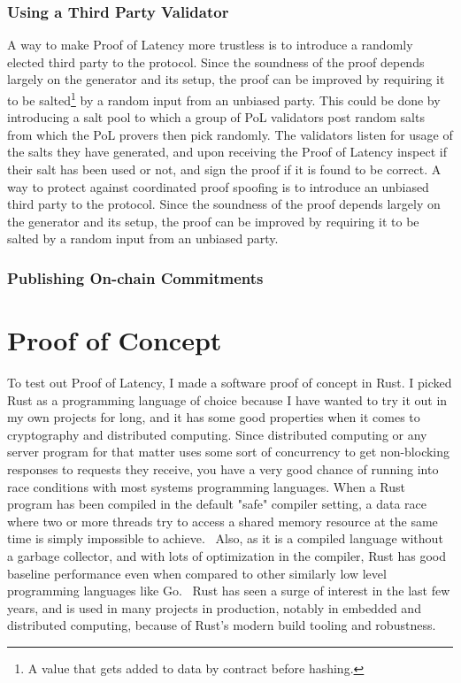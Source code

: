 \subsection{Using a Third Party Validator}
A way to make Proof of Latency more trustless is to introduce a randomly elected third party to the protocol. Since the soundness of the proof depends largely on the generator and its setup, the proof can be improved by requiring it to be salted\footnote{A value that gets added to data by contract before hashing.} by a random input from an unbiased party. This could be done by introducing a salt pool to which a group of PoL validators post random salts from which the PoL provers then pick randomly. The validators listen for usage of the salts they have generated, and upon receiving the Proof of Latency inspect if their salt has been used or not, and sign the proof if it is found to be correct. A way to protect against coordinated proof spoofing is to introduce an unbiased third party to the protocol. Since the soundness of the proof depends largely on the generator and its setup, the proof can be improved by requiring it to be salted by a random input from an unbiased party.


\subsection{Publishing On-chain Commitments}

\chapter{Proof of Concept}
\label{Proof of Concept}
To test out Proof of Latency, I made a software proof of concept in Rust. I picked Rust as a programming language of choice because I have wanted to try it out in my own projects for long, and it has some good properties when it comes to cryptography and distributed computing. Since distributed computing or any server program for that matter uses some sort of concurrency to get non-blocking responses to requests they receive, you have a very good chance of running into race conditions with most systems programming languages. When a Rust program has been compiled in the default "safe" compiler setting, a data race where two or more threads try to access a shared memory resource at the same time is simply impossible to achieve.~\cite{The_Rust_Project_Developers2018-xh} Also, as it is a compiled language without a garbage collector, and with lots of optimization in the compiler, Rust has good baseline performance even when compared to other similarly low level programming languages like Go.~\cite{Howarth2020-zc} Rust has seen a surge of interest in the last few years, and is used in many projects in production, notably in embedded and distributed computing, because of Rust's modern build tooling and robustness.

